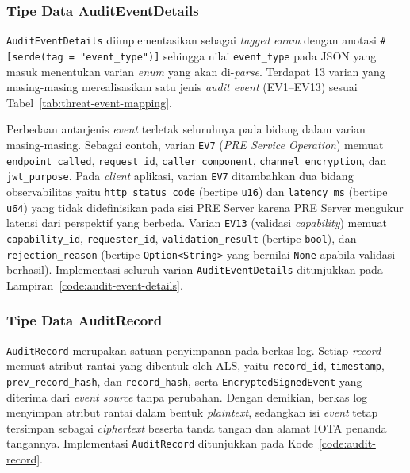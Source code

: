 \subsubsection{Tipe Data AuditEventDetails}

\texttt{AuditEventDetails} diimplementasikan sebagai \textit{tagged enum} dengan
anotasi \texttt{\#[serde(tag = "event\_type")]} sehingga nilai \texttt{event\_type}
pada JSON yang masuk menentukan varian \textit{enum} yang akan di-\textit{parse}.
Terdapat 13 varian yang masing-masing merealisasikan satu jenis \textit{audit
event} (EV1--EV13) sesuai Tabel~\ref{tab:threat-event-mapping}.

Perbedaan antarjenis \textit{event} terletak seluruhnya pada bidang dalam varian
masing-masing. Sebagai contoh, varian \texttt{EV7} (\textit{PRE Service
Operation}) memuat \texttt{endpoint\_called}, \texttt{request\_id},
\texttt{caller\_component}, \texttt{channel\_encryption}, dan
\texttt{jwt\_purpose}. Pada \textit{client} aplikasi, varian \texttt{EV7}
ditambahkan dua bidang observabilitas yaitu \texttt{http\_status\_code}
(bertipe \texttt{u16}) dan \texttt{latency\_ms} (bertipe \texttt{u64}) yang
tidak didefinisikan pada sisi PRE Server karena PRE Server mengukur latensi
dari perspektif yang berbeda. Varian \texttt{EV13} (validasi \textit{capability})
memuat \texttt{capability\_id}, \texttt{requester\_id},
\texttt{validation\_result} (bertipe \texttt{bool}), dan
\texttt{rejection\_reason} (bertipe \texttt{Option<String>} yang bernilai
\texttt{None} apabila validasi berhasil). Implementasi seluruh varian
\texttt{AuditEventDetails} ditunjukkan pada Lampiran~\ref{code:audit-event-details}.

\subsubsection{Tipe Data AuditRecord}
 
\texttt{AuditRecord} merupakan satuan penyimpanan pada berkas log. Setiap
\textit{record} memuat atribut rantai yang dibentuk oleh ALS, yaitu
\texttt{record\_id}, \texttt{timestamp}, \texttt{prev\_record\_hash}, dan
\texttt{record\_hash}, serta \texttt{EncryptedSignedEvent} yang diterima dari
\textit{event source} tanpa perubahan. Dengan demikian, berkas log menyimpan
atribut rantai dalam bentuk \textit{plaintext}, sedangkan isi \textit{event}
tetap tersimpan sebagai \textit{ciphertext} beserta tanda tangan dan alamat IOTA
penanda tangannya. Implementasi \texttt{AuditRecord} ditunjukkan pada
Kode~\ref{code:audit-record}.
 
